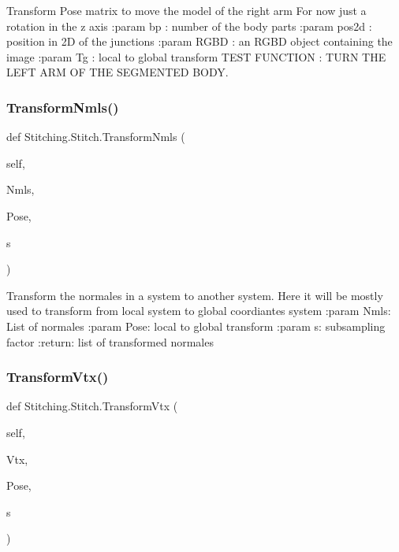 \begin{DoxyVerb}Transform Pose matrix to move the model of the right arm
For now just a rotation in the z axis
:param bp : number of the body parts
:param pos2d : position in 2D of the junctions
:param RGBD : an RGBD object containing the image
:param Tg : local to global transform
TEST FUNCTION : TURN THE LEFT ARM OF THE SEGMENTED BODY.
\end{DoxyVerb}
 \mbox{\label{class_stitching_1_1_stitch_a9df52cb70ec0a02cf93ac0ea9f09706c}} 
\subsubsection{\texorpdfstring{Transform\+Nmls()}{TransformNmls()}}
{\footnotesize\ttfamily def Stitching.\+Stitch.\+Transform\+Nmls (\begin{DoxyParamCaption}\item[{}]{self,  }\item[{}]{Nmls,  }\item[{}]{Pose,  }\item[{}]{s }\end{DoxyParamCaption})}

\begin{DoxyVerb}Transform the normales in a system to another system.
Here it will be mostly used to transform from local system to global coordiantes system
:param Nmls:  List of normales
:param Pose: local to global transform
:param s: subsampling factor
:return: list of transformed normales
\end{DoxyVerb}
 \mbox{\label{class_stitching_1_1_stitch_addf2733c95c1a99895485f639989c971}} 
\subsubsection{\texorpdfstring{Transform\+Vtx()}{TransformVtx()}}
{\footnotesize\ttfamily def Stitching.\+Stitch.\+Transform\+Vtx (\begin{DoxyParamCaption}\item[{}]{self,  }\item[{}]{Vtx,  }\item[{}]{Pose,  }\item[{}]{s }\end{DoxyParamCaption})}


